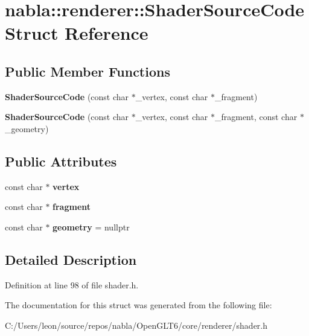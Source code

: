 \hypertarget{structnabla_1_1renderer_1_1_shader_source_code}{}\section{nabla\+::renderer\+::Shader\+Source\+Code Struct Reference}
\label{structnabla_1_1renderer_1_1_shader_source_code}
\subsection*{Public Member Functions}
\begin{DoxyCompactItemize}
\item 
\mbox{\label{structnabla_1_1renderer_1_1_shader_source_code_ad573c2db354f2f212725732f3a2d14ac}} 
{\bfseries Shader\+Source\+Code} (const char $\ast$\+\_\+vertex, const char $\ast$\+\_\+fragment)
\item 
\mbox{\label{structnabla_1_1renderer_1_1_shader_source_code_a04c3f8a9ade806793406fe07ec594d9d}} 
{\bfseries Shader\+Source\+Code} (const char $\ast$\+\_\+vertex, const char $\ast$\+\_\+fragment, const char $\ast$\+\_\+geometry)
\end{DoxyCompactItemize}
\subsection*{Public Attributes}
\begin{DoxyCompactItemize}
\item 
\mbox{\label{structnabla_1_1renderer_1_1_shader_source_code_afc48876842af984732f884fb22911aed}} 
const char $\ast$ {\bfseries vertex}
\item 
\mbox{\label{structnabla_1_1renderer_1_1_shader_source_code_aae6a01e4f9ea67fc593f095c20ec999d}} 
const char $\ast$ {\bfseries fragment}
\item 
\mbox{\label{structnabla_1_1renderer_1_1_shader_source_code_afea8b2bd68bb4752106e1fa5d9dc6b8a}} 
const char $\ast$ {\bfseries geometry} = nullptr
\end{DoxyCompactItemize}


\subsection{Detailed Description}


Definition at line 98 of file shader.\+h.



The documentation for this struct was generated from the following file\+:\begin{DoxyCompactItemize}
\item 
C\+:/\+Users/leon/source/repos/nabla/\+Open\+G\+L\+T6/core/renderer/shader.\+h\end{DoxyCompactItemize}
